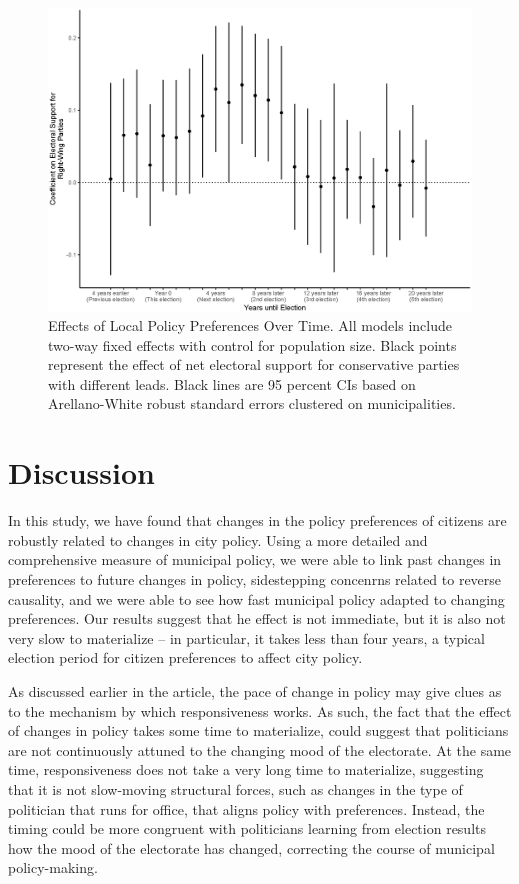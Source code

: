 \documentclass[a4paper,12pt]{article}
\begin{document}
\begin{figure}[htbp]
	\centering
	\includegraphics[scale = .65]{dynamics.eps}
	\caption{Effects of Local Policy Preferences Over Time. All models include two-way fixed effects with control for population size. Black points represent the effect of net electoral support for conservative parties with different leads. Black lines are 95 percent CIs based on Arellano-White robust standard errors clustered on municipalities. }
	\label{fig:LongRun}
\end{figure}




\section*{Discussion}

In this study, we have found that changes in the policy preferences of citizens are robustly related to changes in city policy.  Using a more detailed and comprehensive measure of municipal policy, we were able to link past changes in preferences to future changes in policy, sidestepping concenrns related to reverse causality, and we were able to see how fast municipal policy adapted to changing preferences. Our results suggest that he effect is not immediate, but it is also not very slow to materialize -- in particular, it takes less than four years, a typical election period for citizen preferences to affect city policy.

As discussed earlier in the article, the pace of change in policy may give clues as to the mechanism by which responsiveness works. As such, the fact that the effect of changes in policy takes some time to materialize, could suggest that politicians are not continuously  attuned to the changing mood of the electorate. At the same time, responsiveness does not take a very long time to materialize, suggesting that it is not slow-moving structural forces, such as changes in the type of politician that runs for office, that aligns policy with preferences. Instead, the timing could be more congruent with politicians learning from election results how the mood of the electorate has changed, correcting the course of municipal policy-making. 
\end{document}
